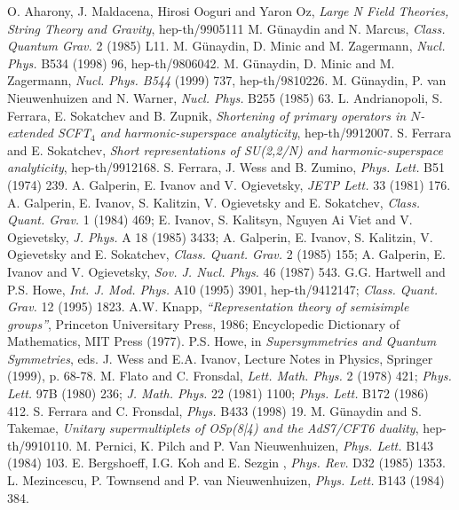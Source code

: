 \documentclass[a4paper,12pt]{article}
\begin{document}
\begin{thebibliography}{99}


 O. Aharony, J. Maldacena, Hirosi Ooguri and Yaron Oz, {\it Large N Field Theories, String Theory and 
Gravity}, hep-th/9905111 
M. G\"unaydin and N. Marcus, {\it Class. Quantum Grav.} 2 (1985) 
L11.
M. G\"unaydin, D. Minic and  M. Zagermann, {\it Nucl. Phys.} B534 
(1998) 96, hep-th/9806042. 
M. G\"unaydin, D. Minic and  M. Zagermann, {\it Nucl. Phys. B544} 
(1999) 737, hep-th/9810226. 
 M. G\"unaydin, P. van Nieuwenhuizen and N. Warner, 
{\it Nucl. Phys.} B255 (1985) 63. 
 L. Andrianopoli, S. Ferrara, E. Sokatchev and B. Zupnik, 
{\it Shortening of primary operators in $N$-extended SCFT$_4$ and 
harmonic-superspace analyticity}, hep-th/9912007. 
 S. Ferrara and E. Sokatchev,  
{\it Short representations of SU(2,2/N) and harmonic-superspace 
analyticity}, hep-th/9912168. 
S. Ferrara, J. Wess and B. Zumino, {\it Phys. Lett.} B51 (1974) 
239.
 A. 
Galperin, E. Ivanov and V. Ogievetsky, {\it JETP Lett.} 33 (1981) 
176.  
 A. Galperin, E. Ivanov, S. Kalitzin, V. Ogievetsky and
E. Sokatchev, {\it Class. Quant. Grav.} 1 (1984) 469; E. Ivanov, 
S. Kalitsyn, Nguyen Ai Viet and V. Ogievetsky, {\it J. Phys.}  A 
18 (1985) 3433; A. Galperin, E. Ivanov, S. Kalitzin, V. Ogievetsky 
and E. Sokatchev, {\it Class. Quant. Grav.}  2 (1985) 155; A. 
Galperin, E. Ivanov and V. Ogievetsky, {\it Sov. J. Nucl. Phys.} 
46 (1987) 543. 
G.G. Hartwell and P.S. Howe, {\it Int. J. Mod. Phys.} A10 (1995) 
3901, hep-th/9412147; {\it Class. Quant. Grav.}  12 (1995) 1823.
A.W. Knapp, {\sl ``Representation theory of semisimple groups''}, 
Princeton Universitary Press, 1986; Encyclopedic Dictionary of 
Mathematics, MIT Press (1977). 
 P.S. Howe, in {\it Supersymmetries and Quantum 
Symmetries}, eds. J. Wess and E.A. Ivanov, Lecture Notes in 
Physics, Springer (1999), p. 68-78. 
M. Flato and C. Fronsdal, {\it Lett. Math. Phys.} 2 (1978) 421; 
{\it Phys. Lett.} 97B (1980) 236; {\it J. Math. Phys.} 22 (1981) 
1100; {\it Phys. Lett.} B172 (1986) 412.
 S. Ferrara and C. Fronsdal, {\it  Phys.} B433 (1998) 19.
 M. G\"unaydin and S. Takemae, {\it Unitary supermultiplets 
of OSp(8|4) and the AdS7/CFT6 duality}, hep-th/9910110. 
 M. Pernici, K. Pilch and P. Van Nieuwenhuizen, 
{\it  Phys. Lett.} B143 (1984) 103. 
 E. Bergshoeff, I.G. Koh and E. Sezgin , {\it Phys. Rev.} D32 
(1985) 1353. 
 L. Mezincescu, P. Townsend and P. van Nieuwenhuizen, 
{\it  Phys. Lett.} B143 (1984) 384.
 

\end{thebibliography}
\end{document}
